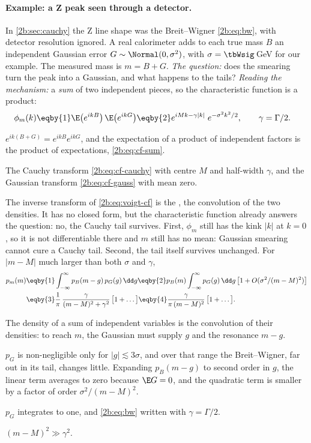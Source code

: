 \paragraph{Example: a Z peak seen through a detector.} In \cref{2b:sec:cauchy} the Z line shape was the Breit--Wigner \eqref{2b:eq:bw}, with detector resolution ignored. A real calorimeter adds to each true mass $B$ an independent Gaussian error $G\sim\Normal(0,\sigma^2)$, with $\sigma=\tbWsig$\,GeV for our example. The measured mass is $m=B+G$. \emph{The question:} does the smearing turn the peak into a Gaussian, and what happens to the tails? \emph{Reading the mechanism:} a \emph{sum} of two independent pieces, so the characteristic function is a product:
\begin{align}
  \phi_m(k)
  &\eqby{1}\E\bigl(e^{ikB}\bigr)\,\E\bigl(e^{ikG}\bigr)
   \eqby{2}e^{iMk-\gamma|k|}\;e^{-\sigma^2k^2/2},\qquad \gamma=\Gamma/2 .
  \label{2b:eq:voigt-cf}
\end{align}
\begin{explain}
  \item $e^{ik(B+G)}=e^{ikB}e^{ikG}$, and the expectation of a product of independent factors is the product of expectations, \eqref{2b:eq:cf-sum}.
  \item The Cauchy transform \eqref{2b:eq:cf-cauchy} with centre $M$ and half-width $\gamma$, and the Gaussian transform \eqref{2b:eq:cf-gauss} with mean zero.
\end{explain}
The inverse transform of \eqref{2b:eq:voigt-cf} is the , the convolution of the two densities. It has no closed form, but the characteristic function already answers the question: no, the Cauchy tail survives. First, $\phi_m$ still has the kink $|k|$ at $k=0$, so it is not differentiable there and $m$ still has no mean: Gaussian smearing cannot cure a Cauchy tail. Second, the tail itself survives unchanged. For $|m-M|$ much larger than both $\sigma$ and $\gamma$,
\begin{align}
  p_m(m)
  &\eqby{1}\int_{-\infty}^{\infty}p_B(m-g)\,p_G(g)\,\dd g
   \eqby{2}p_B(m)\int_{-\infty}^{\infty}p_G(g)\,\dd g\,\bigl[1+O(\sigma^2/(m-M)^2)\bigr] \nonumber\\
  &\eqby{3}\frac1\pi\,\frac{\gamma}{(m-M)^2+\gamma^2}\,\bigl[1+\dots\bigr]
   \eqby{4}\frac{\gamma}{\pi\,(m-M)^2}\,\bigl[1+\dots\bigr] .
  \label{2b:eq:voigt-tail}
\end{align}
\begin{explain}
  \item The density of a sum of independent variables is the convolution of their densities: to reach $m$, the Gaussian must supply $g$ and the resonance $m-g$.
  \item $p_G$ is non-negligible only for $|g|\lesssim3\sigma$, and over that range the Breit--Wigner, far out in its tail, changes little. Expanding $p_B(m-g)$ to second order in $g$, the linear term averages to zero because $\E G=0$, and the quadratic term is smaller by a factor of order $\sigma^2/(m-M)^2$.
  \item $p_G$ integrates to one, and \eqref{2b:eq:bw} written with $\gamma=\Gamma/2$.
  \item $(m-M)^2\gg\gamma^2$.
\end{explain}
